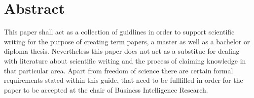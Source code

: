 \documentclass[
               fontsize=12pt, %
               paper=a4,
               oneside,  %
               BCOR=3mm, %
               DIV=13,   %
               headinclude=true,
               footinclude=false,
               bibliography=totoc,
               headsepline,
               parskip=half,
               draft    %
			numbers=noenddot
               ]{scrbook}
\begin{document}


%
%
%





\Titelblatt
{}
\pagestyle{preamble}
\renewcommand*{\chapterpagestyle}{preamble}

\section*{Abstract}
This paper shall act as a collection of guidlines in order to support scientific writing for the purpose of creating term papers, a master as well as a bachelor or diploma thesis. Nevertheless this paper does not act as a substitue for dealing with literature about scientific writing and the process of claiming knowledge in that particular area. Apart from freedom of science there are certain formal requirements stated within this guide, that need to be fullfilled in order for the paper to be accepted at the chair of Business Intelligence Research.

\cleardoublepage


\end{document}
